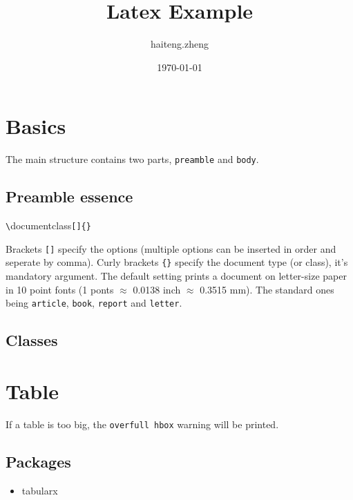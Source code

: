 \documentclass[a4paper, 10pt, letterpaper, portrait, oneside]{article}
\title{Latex Example}
\author{haiteng.zheng}
\date{\today}
\renewcommand\emph[1]{\colorbox{light-gray}{\texttt{#1}}}
\begin{document}
\maketitle
\tableofcontents

\section{Basics}
The main structure contains two parts, \emph{preamble} and \emph{body}.
\subsection{Preamble essence}
\begin{tcolorbox}
	\verb"\"documentclass\verb![]{}!
\end{tcolorbox}

Brackets \emph{[]} specify the options (multiple options can be inserted 
in order and seperate by comma).
Curly brackets \emph{\{\}} specify the document type (or class), it's mandatory 
argument. The default setting prints a document on letter-size paper in 10 point 
fonts (1 ponts $\approx$ 0.0138 inch $\approx$ 0.3515 mm).
The standard ones being \emph{article}, \emph{book}, \emph{report} and \emph{letter}.


\subsection{Classes}

\section{Table}
If a table is too big, the \emph{overfull hbox} warning will be printed.
\subsection{Packages}
\begin{itemize}
	\item tabularx
\end{itemize}
\end{document}
